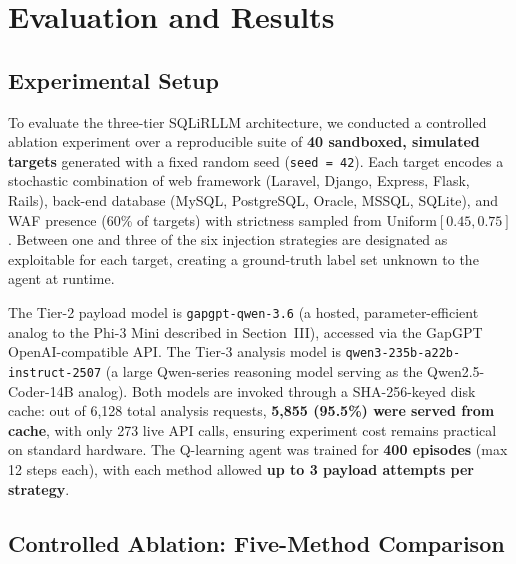 %

\section{Evaluation and Results}

\subsection{Experimental Setup}

To evaluate the three-tier SQLiRLLM architecture, we conducted a controlled
ablation experiment over a reproducible suite of \textbf{40 sandboxed, simulated
targets} generated with a fixed random seed (\texttt{seed\,=\,42}). Each target
encodes a stochastic combination of web framework (Laravel, Django, Express,
Flask, Rails), back-end database (MySQL, PostgreSQL, Oracle, MSSQL, SQLite),
and WAF presence (60\% of targets) with strictness sampled from
Uniform$[0.45, 0.75]$. Between one and three of the six injection strategies are
designated as exploitable for each target, creating a ground-truth label set
unknown to the agent at runtime.

The Tier-2 payload model is \texttt{gapgpt-qwen-3.6} (a hosted, parameter-efficient
analog to the Phi-3 Mini described in Section~III), accessed via the GapGPT
OpenAI-compatible API. The Tier-3 analysis model is
\texttt{qwen3-235b-a22b-instruct-2507} (a large Qwen-series reasoning model
serving as the Qwen2.5-Coder-14B analog). Both models are invoked through a
SHA-256-keyed disk cache: out of 6{,}128 total analysis requests, \textbf{5{,}855
(95.5\%) were served from cache}, with only 273 live API calls, ensuring
experiment cost remains practical on standard hardware. The Q-learning agent
was trained for \textbf{400 episodes} (max 12 steps each), with each method
allowed \textbf{up to 3 payload attempts per strategy}.

\subsection{Controlled Ablation: Five-Method Comparison}


